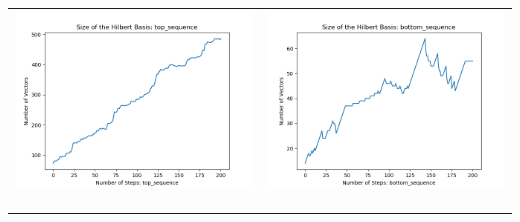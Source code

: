 \documentclass[10pt]{article}
\begin{document}
\begin{tabular}{c|c}
\begin{minipage}{.4\textwidth}
\includegraphics[width=\textwidth]{"DATA/5d/6 generators 2 bound E/top_sequence SIZE"}
\end{minipage} &
\begin{minipage}{.4\textwidth}
\includegraphics[width=\textwidth]{"DATA/5d/6 generators 2 bound E bottomup/bottom_sequence SIZE"}
\end{minipage} \\ \\
\hline \\\begin{minipage}{.4\textwidth}

\end{minipage}
\end{tabular}
\end{document}
